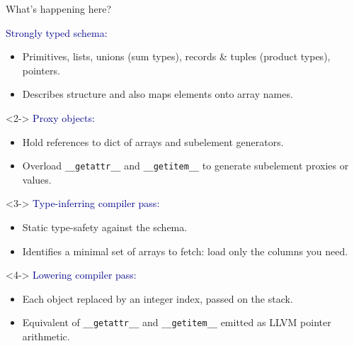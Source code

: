 \documentclass[aspectratio=169]{beamer}
\begin{document}
\begin{frame}{What's happening here?}
\vspace{0.4 cm}

\textcolor{darkblue}{\large Strongly typed schema:}
\begin{itemize}
\item Primitives, lists, unions (sum types), records \& tuples (product types), pointers.
\item Describes structure and also maps elements onto array names.
\end{itemize}

\vspace{0.25 cm}
\begin{uncoverenv}<2->
\textcolor{darkblue}{\large Proxy objects:}
\begin{itemize}
\item Hold references to dict of arrays and subelement generators.
\item Overload {\tt\small \_\_getattr\_\_} and {\tt\small \_\_getitem\_\_} to generate subelement proxies or values.
\end{itemize}
\end{uncoverenv}

\begin{uncoverenv}<3->
\vspace{0.25 cm}
\textcolor{darkblue}{\large Type-inferring compiler pass:}
\begin{itemize}
\item Static type-safety against the schema.
\item Identifies a minimal set of arrays to fetch: load only the columns you need.
\end{itemize}
\end{uncoverenv}

\begin{uncoverenv}<4->
\vspace{0.25 cm}
\textcolor{darkblue}{\large Lowering compiler pass:}
\begin{itemize}
\item Each object replaced by an integer index, passed on the stack.
\item Equivalent of {\tt\small \_\_getattr\_\_} and {\tt\small \_\_getitem\_\_} emitted as LLVM pointer arithmetic.
\end{itemize}
\end{uncoverenv}
\end{frame}
\end{document}

